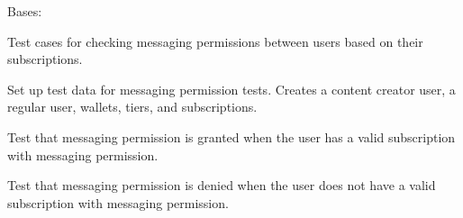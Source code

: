 \documentclass[letterpaper,10pt,english]{sphinxmanual}
\begin{document}
\begin{fulllineitems}
\label{\detokenize{modules/tests:interactions.tests.MessagingPermissionTests}}
\pysigstartsignatures
{}
\pysigstopsignatures
\sphinxAtStartPar
Bases: 

\sphinxAtStartPar
Test cases for checking messaging permissions between users based on their subscriptions.

\begin{fulllineitems}
\label{\detokenize{modules/tests:interactions.tests.MessagingPermissionTests.setUp}}
\pysigstartsignatures
{}
\pysigstopsignatures
\sphinxAtStartPar
Set up test data for messaging permission tests.
Creates a content creator user, a regular user, wallets, tiers, and subscriptions.

\end{fulllineitems}


\begin{fulllineitems}
\label{\detokenize{modules/tests:interactions.tests.MessagingPermissionTests.test_has_messaging_permission_with_permission}}
\pysigstartsignatures
{}
\pysigstopsignatures
\sphinxAtStartPar
Test that messaging permission is granted when the user has a valid subscription with messaging permission.

\end{fulllineitems}


\begin{fulllineitems}
\label{\detokenize{modules/tests:interactions.tests.MessagingPermissionTests.test_has_messaging_permission_without_permission}}
\pysigstartsignatures
{}
\pysigstopsignatures
\sphinxAtStartPar
Test that messaging permission is denied when the user does not have a valid subscription with messaging permission.

\end{fulllineitems}


\end{fulllineitems}
\end{document}
